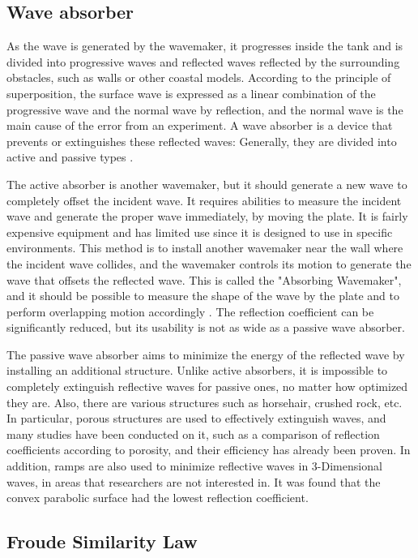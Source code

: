 \subsection{Wave absorber}

As the wave is generated by the wavemaker, it progresses inside the tank and is divided into progressive waves and reflected waves reflected by the surrounding obstacles, such as walls or other coastal models. According to the principle of superposition, the surface wave is expressed as a linear combination of the progressive wave and the normal wave by reflection, and the normal wave is the main cause of the error from an experiment. A wave absorber is a device that prevents or extinguishes these reflected waves: Generally, they are divided into active and passive types \cite{ouellet1986survey}.

The active absorber is another wavemaker, but it should generate a new wave to completely offset the incident wave. It requires abilities to measure the incident wave and generate the proper wave immediately, by moving the plate. It is fairly expensive equipment and has limited use since it is designed to use in specific environments. This method is to install another wavemaker near the wall where the incident wave collides, and the wavemaker controls its motion to generate the wave that offsets the reflected wave. This is called the "Absorbing Wavemaker", and it should be possible to measure the shape of the wave by the plate and to perform overlapping motion accordingly \cite{frigaard1995absorbing}. The reflection coefficient can be significantly reduced, but its usability is not as wide as a passive wave absorber.

The passive wave absorber aims to minimize the energy of the reflected wave by installing an additional structure. Unlike active absorbers, it is impossible to completely extinguish reflective waves for passive ones, no matter how optimized they are. Also, there are various structures such as horsehair, crushed rock, etc. In particular, porous structures are used to effectively extinguish waves, and many studies have been conducted on it, such as a comparison of reflection coefficients according to porosity, and their efficiency has already been proven. In addition, ramps are also used to minimize reflective waves in 3-Dimensional waves, in areas that researchers are not interested in. It was found that the convex parabolic surface had the lowest reflection coefficient.

\subsection{Froude Similarity Law}

